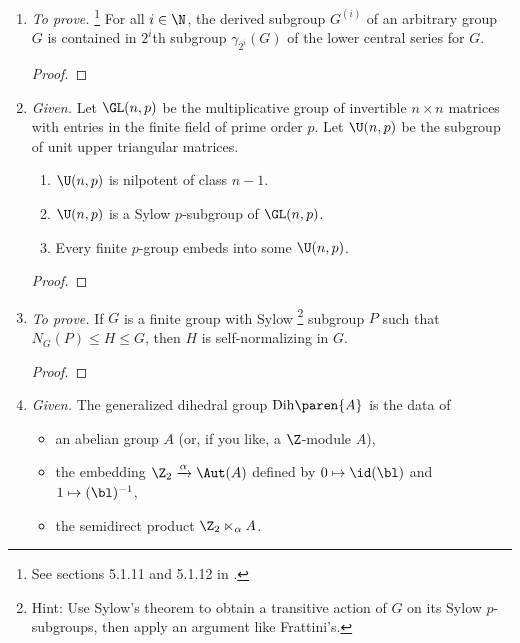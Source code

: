 \documentclass[onesided]{ccg-pset}
\author{Colton Grainger}
\date{\today}
\newcommand{\Dih}[1]{\mathrm{Dih}\paren{ #1 }}
\begin{document}
\maketitle

\begin{enumerate}

\item \emph{To prove.}%
    \footnote{%
    See sections 5.1.11 and 5.1.12 in \cite{Rob96}.
    }
 For all $i \in \N$, the derived subgroup $G^{(i)}$ of an arbitrary group $G$ is contained in $2^{i}$th subgroup $\gamma_{2^i}(G)$ of the lower central series for $G$.

\begin{proof}
\end{proof}

\item \emph{Given.} Let $\GL(n,p)$ be the multiplicative group of invertible $n \times n$ matrices with entries in the finite field of prime order $p$. Let $\U(n,p)$ be the subgroup of unit upper triangular matrices.
\begin{prop*}
\label{prop:2}
\hfill
\begin{enumerate}
    \item $\U(n,p)$ is nilpotent of class $n-1$.
    \item $\U(n,p)$ is a Sylow $p$-subgroup of $\GL(n,p)$.
    \item Every finite $p$-group embeds into some $\U(n,p)$.
\end{enumerate}
\end{prop*}

\begin{proof}
\end{proof}

\item \emph{To prove.} If $G$ is a finite group with Sylow%
    \footnote{%
    Hint: Use Sylow's theorem to obtain a transitive action of $G$ on its Sylow $p$-subgroups, then apply an argument like Frattini's.
    }
 subgroup $P$ such that $N_G(P) \le H \le G$, then $H$ is self-normalizing in $G$.

\begin{proof}

\end{proof}

\item \emph{Given.} The generalized dihedral group $\Dih A$ is the data of
\begin{itemize}
    \item an abelian group $A$ (or, if you like, a $\Z$-module $A$),
    \item the embedding $\Z_2 \xrightarrow{\alpha} \Aut(A)$ defined by $0 \mapsto \id(\bl)$ and $1 \mapsto (\bl)^{-1}$, 
    \item the semidirect product $\Z_2 \ltimes_\alpha A$.
\end{itemize}


\end{enumerate}
\end{document}
